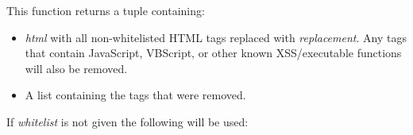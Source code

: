 \documentclass[letterpaper,10pt,openany]{sphinxmanual}
\begin{document}
\begin{fulllineitems}
\label{Developer/utils:gateone.core.utils.strip_xss}
This function returns a tuple containing:
\begin{itemize}
\item {} 
\emph{html} with all non-whitelisted HTML tags replaced with \emph{replacement}.  Any tags that contain JavaScript, VBScript, or other known XSS/executable functions will also be removed.

\item {} 
A list containing the tags that were removed.

\end{itemize}

If \emph{whitelist} is not given the following will be used:


\end{fulllineitems}
\end{document}
